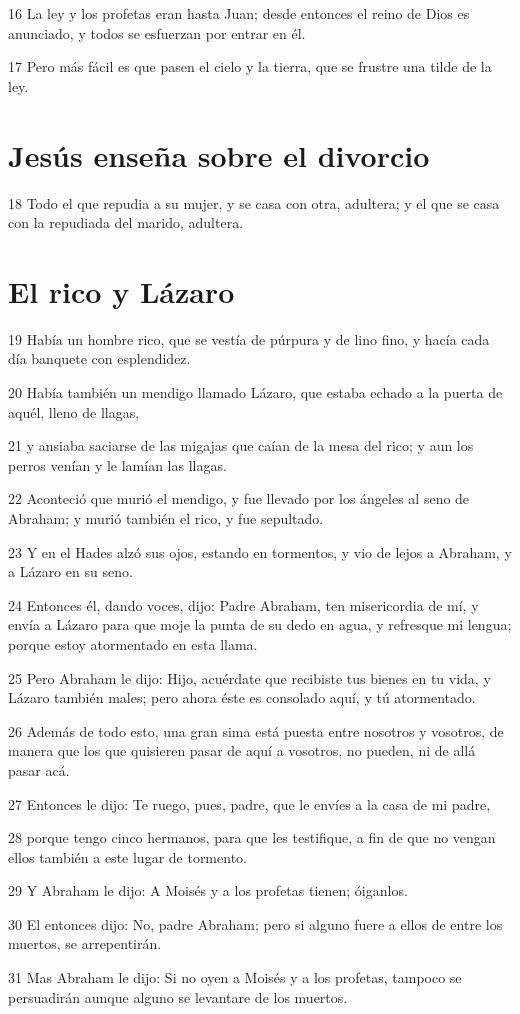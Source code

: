 \par 16 La ley y los profetas eran hasta Juan; desde entonces el reino de Dios es anunciado, y todos se esfuerzan por entrar en él.
\par 17 Pero más fácil es que pasen el cielo y la tierra, que se frustre una tilde de la ley.

\section*{Jesús enseña sobre el divorcio}

\par 18 Todo el que repudia a su mujer, y se casa con otra, adultera; y el que se casa con la repudiada del marido, adultera.

\section*{El rico y Lázaro}

\par 19 Había un hombre rico, que se vestía de púrpura y de lino fino, y hacía cada día banquete con esplendidez.
\par 20 Había también un mendigo llamado Lázaro, que estaba echado a la puerta de aquél, lleno de llagas,
\par 21 y ansiaba saciarse de las migajas que caían de la mesa del rico; y aun los perros venían y le lamían las llagas.
\par 22 Aconteció que murió el mendigo, y fue llevado por los ángeles al seno de Abraham; y murió también el rico, y fue sepultado.
\par 23 Y en el Hades alzó sus ojos, estando en tormentos, y vio de lejos a Abraham, y a Lázaro en su seno.
\par 24 Entonces él, dando voces, dijo: Padre Abraham, ten misericordia de mí, y envía a Lázaro para que moje la punta de su dedo en agua, y refresque mi lengua; porque estoy atormentado en esta llama.
\par 25 Pero Abraham le dijo: Hijo, acuérdate que recibiste tus bienes en tu vida, y Lázaro también males; pero ahora éste es consolado aquí, y tú atormentado.
\par 26 Además de todo esto, una gran sima está puesta entre nosotros y vosotros, de manera que los que quisieren pasar de aquí a vosotros, no pueden, ni de allá pasar acá.
\par 27 Entonces le dijo: Te ruego, pues, padre, que le envíes a la casa de mi padre,
\par 28 porque tengo cinco hermanos, para que les testifique, a fin de que no vengan ellos también a este lugar de tormento.
\par 29 Y Abraham le dijo: A Moisés y a los profetas tienen; óiganlos.
\par 30 El entonces dijo: No, padre Abraham; pero si alguno fuere a ellos de entre los muertos, se arrepentirán.
\par 31 Mas Abraham le dijo: Si no oyen a Moisés y a los profetas, tampoco se persuadirán aunque alguno se levantare de los muertos.

